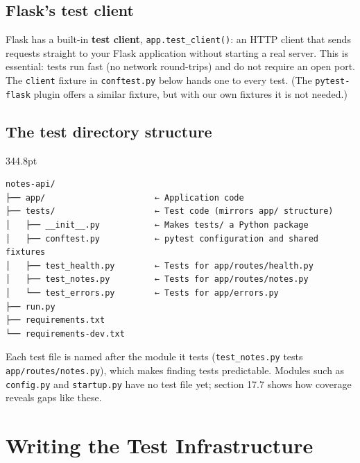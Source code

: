 \subsection*{Flask's test client}\label{17-build-process:flasks-test-client}

Flask has a built-in \textbf{test client}, \texttt{app.test\_client()}: an HTTP client that sends requests straight to your Flask application without starting a real server. This is essential: tests run fast (no network round-trips) and do not require an open port. The \texttt{client} fixture in \texttt{conftest.py} below hands one to every test. (The \texttt{pytest-flask} plugin offers a similar fixture, but with our own fixtures it is not needed.)

\subsection*{The test directory structure}\label{17-build-process:the-test-directory-structure}

\begin{diagrambox}[short]{344.8pt}
\begin{Verbatim}[fontsize=\fontsize{9.0}{8.55}\selectfont]
notes-api/
├── app/                      ← Application code
├── tests/                    ← Test code (mirrors app/ structure)
│   ├── __init__.py           ← Makes tests/ a Python package
│   ├── conftest.py           ← pytest configuration and shared fixtures
│   ├── test_health.py        ← Tests for app/routes/health.py
│   ├── test_notes.py         ← Tests for app/routes/notes.py
│   └── test_errors.py        ← Tests for app/errors.py
├── run.py
├── requirements.txt
└── requirements-dev.txt
\end{Verbatim}
\end{diagrambox}

\noindent{}Each test file is named after the module it tests (\texttt{test\_notes.py} tests \texttt{app/}\allowbreak{}\texttt{routes/}\allowbreak{}\texttt{notes.py}), which makes finding tests predictable. Modules such as \texttt{config.py} and \texttt{startup.py} have no test file yet; section 17.7 shows how coverage reveals gaps like these.

\setcounter{section}{2}
\section{Writing the Test Infrastructure}\label{17-build-process:173-writing-the-test-infrastructure}

